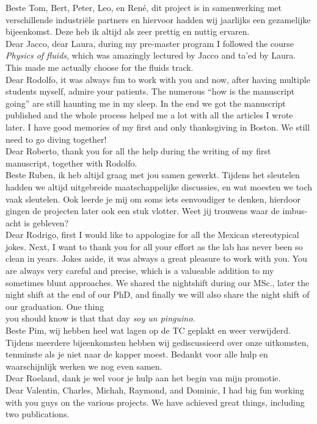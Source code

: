\mfl{\flagnl}Beste Tom, Bert, Peter, Leo, en Ren\'e, dit
project is in samenwerking met verschillende industri\"ele partners en
hiervoor hadden wij jaarlijks een gezamelijke bijeenkomst. Deze heb ik altijd
als zeer prettig en nuttig ervaren.\\
\mfl{\flagus}Dear Jacco, dear Laura, during my pre-master program I
followed the course \emph{Physics of fluids}, which was amazingly lectured by
Jacco and ta'ed by Laura. This made me actually choose for the fluids track.\\
\mfl{\flagus}Dear Rodolfo, it was always fun to work with you and now,
after having multiple students myself, admire your patients. The numerous
``how is the manuscript going'' are still haunting me in my sleep. In the end
we got the manuscript published and the whole process helped me a lot with all
the articles I wrote later. I have good memories of my first and only
thanksgiving in Boston. We still need to go diving together!\\
\mfl{\flagus}Dear Roberto, thank you for all the help during the writing of my
first manuscript, together with Rodolfo.\\
\mfl{\flagnl}Beste Ruben, ik heb altijd graag met jou samen gewerkt.
Tijdens het sleutelen hadden we altijd uitgebreide maatschappelijke
discussies, en wat moesten we toch vaak sleutelen. Ook leerde je mij om soms
iets eenvoudiger te denken, hierdoor gingen de projecten later ook een stuk
vlotter. Weet jij trouwens waar de imbus-acht is gebleven?\\
\mfl{\flagus}Dear Rodrigo, first I would like to appologize for all the
Mexican stereotypical jokes. Next, I want to thank you for all your effort as
the lab has never been so clean in years. Jokes aside, it was always a great
pleasure to work with you. You are always very careful and precise, which is a
valueable addition to my sometimes blunt approaches. We shared the nightshift
during our MSc., later the night shift at the end of our PhD, and finally we
will also share the night shift of our graduation. One thing\\
\mfl{\flagsp}\hspace{-0.6cm} you should know is that that day \emph{soy un pinguino.}\\
\mfl{\flagnl}Beste Pim, wij hebben heel wat lagen op de TC geplakt en weer
verwijderd. Tijdens meerdere bijeenkomsten hebben wij gediscussieerd over onze
uitkomsten, tenminste als je niet naar de kapper moest. Bedankt voor alle hulp
en waarschijnlijk werken we nog even samen.\\
\mfl{\flagnl}Dear Roeland, dank je wel voor je hulp aan het begin van mijn
promotie.\\
\mfl{\flagus}Dear Valentin, Charles, Michah, Raymond, and Dominic, I had big
fun working with you guys on the various projects. We have achieved great
things, including two publications.\\







